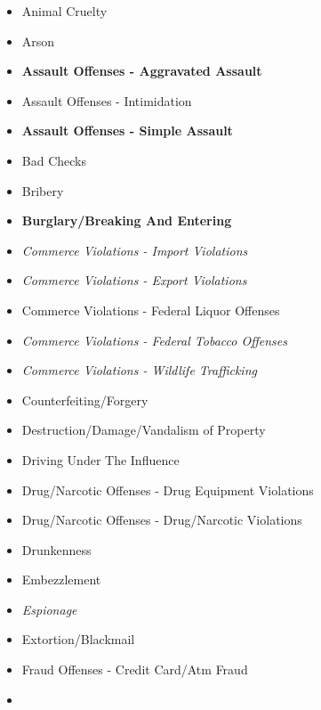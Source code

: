 \documentclass[
]{krantz}
\providecommand{\tightlist}{%
  \setlength{\itemsep}{0pt}\setlength{\parskip}{0pt}}
\begin{document}
\begin{itemize}
\tightlist
\item
  Animal Cruelty\\
\item
  Arson\\
\item
  \textbf{Assault Offenses - Aggravated Assault}\\
\item
  Assault Offenses - Intimidation\\
\item
  \textbf{Assault Offenses - Simple Assault}
\item
  Bad Checks\\
\item
  Bribery\\
\item
  \textbf{Burglary/Breaking And Entering}
\item
  \emph{Commerce Violations - Import Violations}
\item
  \emph{Commerce Violations - Export Violations}
\item
  Commerce Violations - Federal Liquor Offenses\\
\item
  \emph{Commerce Violations - Federal Tobacco Offenses}\\
\item
  \emph{Commerce Violations - Wildlife Trafficking}
\item
  Counterfeiting/Forgery\\
\item
  Destruction/Damage/Vandalism of Property\\
\item
  Driving Under The Influence\\
\item
  Drug/Narcotic Offenses - Drug Equipment Violations\\
\item
  Drug/Narcotic Offenses - Drug/Narcotic Violations\\
\item
  Drunkenness\\
\item
  Embezzlement
\item
  \emph{Espionage}
\item
  Extortion/Blackmail\\
\item
  Fraud Offenses - Credit Card/Atm Fraud\\
\item

\end{itemize}
\end{document}
